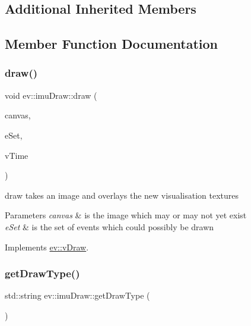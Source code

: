 \subsection*{Additional Inherited Members}


\subsection{Member Function Documentation}
\mbox{\label{classev_1_1imuDraw_addbaf0eff95fe6e791ca53c36218267e}} 
\subsubsection{\texorpdfstring{draw()}{draw()}}
{\footnotesize\ttfamily void ev\+::imu\+Draw\+::draw (\begin{DoxyParamCaption}\item[{cv\+::\+Mat \&}]{canvas,  }\item[{const ev\+::v\+Queue \&}]{e\+Set,  }\item[{int}]{v\+Time }\end{DoxyParamCaption})\hspace{0.3cm}{\ttfamily [virtual]}}



draw takes an image and overlays the new visualisation textures 


\begin{DoxyParams}{Parameters}
{\em canvas} & is the image which may or may not yet exist \\
\hline
{\em e\+Set} & is the set of events which could possibly be drawn \\
\hline
\end{DoxyParams}


Implements \hyperlink{classev_1_1vDraw_af1eee5dcdf3b4cfee6a3024e5cd706f8}{ev\+::v\+Draw}.

\mbox{\label{classev_1_1imuDraw_ab622b53cbe53421958cb7572919a0318}} 
\subsubsection{\texorpdfstring{get\+Draw\+Type()}{getDrawType()}}
{\footnotesize\ttfamily std\+::string ev\+::imu\+Draw\+::get\+Draw\+Type (\begin{DoxyParamCaption}{ }\end{DoxyParamCaption})\hspace{0.3cm}{\ttfamily [virtual]}}



